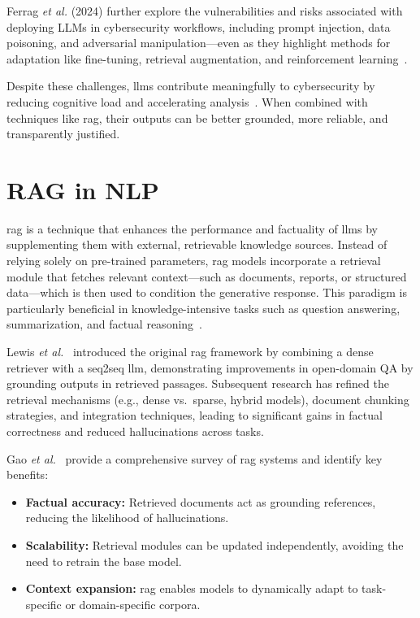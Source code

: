 Ferrag \emph{et al.} (2024) further explore the vulnerabilities and risks associated with deploying
\gls{LLMs} in cybersecurity workflows, including prompt injection, data poisoning, and adversarial
manipulation—even as they highlight methods for adaptation like fine-tuning, retrieval
augmentation, and reinforcement learning~\cite{ferrag2024allinsights}.

Despite these challenges, \glspl{llm} contribute meaningfully to cybersecurity by reducing
cognitive load and accelerating analysis~\cite{ferrag2024allinsights}. When combined with
techniques like \gls{rag}, their outputs can be better grounded, more reliable, and transparently
justified.

\section{RAG in NLP}\label{sec:RAGInNLP}
\gls{rag} is a technique that enhances the performance and factuality of \glspl{llm} by supplementing them with
external, retrievable knowledge sources. Instead of relying solely on pre-trained parameters, \gls{rag}
models incorporate a retrieval module that fetches relevant context—such as documents, reports, or
structured data—which is then used to condition the generative response. This paradigm is
particularly beneficial in knowledge-intensive tasks such as question answering, summarization, and
factual reasoning~\cite{lewis2020retrieval, gao2023retrieval}.

Lewis \emph{et al.}~\cite{lewis2020retrieval} introduced the original \gls{rag} framework by
combining a dense retriever with a seq2seq \gls{llm}, demonstrating improvements in open-domain QA
by grounding outputs in retrieved passages. Subsequent research has refined the retrieval
mechanisms (e.g., dense vs.\ sparse, hybrid models), document chunking strategies, and integration
techniques, leading to significant gains in factual correctness and reduced hallucinations across
tasks.

Gao \emph{et al.}~\cite{gao2023retrieval} provide a comprehensive survey of \gls{rag} systems and
identify key benefits:
\begin{itemize}
	\item \textbf{Factual accuracy:} Retrieved documents act as grounding
	      references, reducing the likelihood of hallucinations.
	\item \textbf{Scalability:} Retrieval modules can be updated independently,
	      avoiding the need to retrain the base model.
	\item \textbf{Context expansion:} \gls{rag} enables models to dynamically
	      adapt to task-specific or domain-specific corpora.
\end{itemize}

